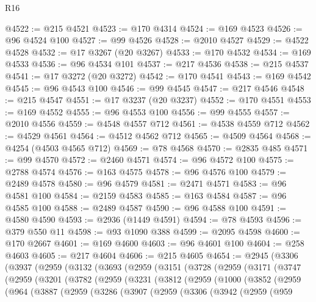 \begin{lexlean}{R16}
\begin{coremodule}
@4522 := @215 @4521
@4523 := @170 @4314
@4524 := @169 @4523
@4526 := @96 @4524 @100
@4527 := @99 @4526
@4528 := @2010 @4527
@4529 := @4522 @4528
@4532 := @17 @3267 (@20 @3267)
@4533 := @170 @4532
@4534 := @169 @4533
@4536 := @96 @4534 @101
@4537 := @217 @4536
@4538 := @215 @4537
@4541 := @17 @3272 (@20 @3272)
@4542 := @170 @4541
@4543 := @169 @4542
@4545 := @96 @4543 @100
@4546 := @99 @4545
@4547 := @217 @4546
@4548 := @215 @4547
@4551 := @17 @3237 (@20 @3237)
@4552 := @170 @4551
@4553 := @169 @4552
@4555 := @96 @4553 @100
@4556 := @99 @4555
@4557 := @2010 @4556
@4559 := @4548 @4557 @712
@4561 := @4538 @4559 @712
@4562 := @4529 @4561
@4564 := @4512 @4562 @712
@4565 := @4509 @4564
@4568 := @4254 (@4503 @4565 @712)
@4569 := @78 @4568
@4570 := @2835 @485
@4571 := @99 @4570
@4572 := @2460 @4571
@4574 := @96 @4572 @100
@4575 := @2788 @4574
@4576 := @163 @4575
@4578 := @96 @4576 @100
@4579 := @2489 @4578
@4580 := @96 @4579
@4581 := @2471 @4571
@4583 := @96 @4581 @100
@4584 := @2159 @4583
@4585 := @163 @4584
@4587 := @96 @4585 @100
@4588 := @2489 @4587
@4590 := @96 @4588 @100
@4591 := @4580 @4590
@4593 := @2936 (@1449 @4591)
@4594 := @78 @4593
@4596 := @379 @550 @11
@4598 := @93 @1090 @388
@4599 := @2095 @4598
@4600 := @170 @2667
@4601 := @169 @4600
@4603 := @96 @4601 @100
@4604 := @258 @4603
@4605 := @217 @4604
@4606 := @215 @4605
@4654 := @2945
    (@3306
      (@3937
        (@2959
          (@3132
            (@3693
              (@2959
                (@3151
                  (@3728
                    (@2959
                      (@3171
                        (@3747
                          (@2959
                            (@3201
                              (@3782
                                (@2959
                                  (@3231
                                    (@3812
                                      (@2959
                                        (@1000
                                          (@3852
                                            (@2959
                                              (@964
                                                (@3887
                                                  (@2959
                                                    (@3286
                                                      (@3907
                                                        (@2959
                                                          (@3306
                                                            (@3942
                                                              (@2959
                                                                (@959

\end{coremodule}
\end{lexlean}
